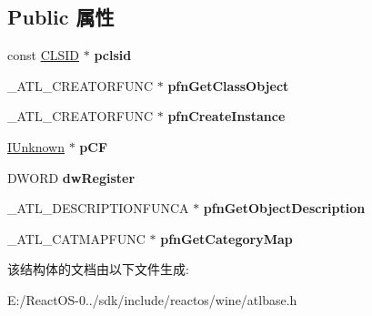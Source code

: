 \subsection*{Public 属性}
\begin{DoxyCompactItemize}
\item 
\mbox{\label{struct___a_t_l___o_b_j_m_a_p___e_n_t_r_y_a___t_a_g_a61c8400c254e4141c89e9dbbc0a05149}} 
const \hyperlink{struct___i_i_d}{C\+L\+S\+ID} $\ast$ {\bfseries pclsid}
\item 
\mbox{\label{struct___a_t_l___o_b_j_m_a_p___e_n_t_r_y_a___t_a_g_a5ac50fe60fd2d99e35f18f5c767abbc6}} 
\+\_\+\+A\+T\+L\+\_\+\+C\+R\+E\+A\+T\+O\+R\+F\+U\+NC $\ast$ {\bfseries pfn\+Get\+Class\+Object}
\item 
\mbox{\label{struct___a_t_l___o_b_j_m_a_p___e_n_t_r_y_a___t_a_g_a2960aeb07da8d9ebedf86a6446924480}} 
\+\_\+\+A\+T\+L\+\_\+\+C\+R\+E\+A\+T\+O\+R\+F\+U\+NC $\ast$ {\bfseries pfn\+Create\+Instance}
\item 
\mbox{\label{struct___a_t_l___o_b_j_m_a_p___e_n_t_r_y_a___t_a_g_a003a8c563b91eae03b6395763f1d0c79}} 
\hyperlink{interface_i_unknown}{I\+Unknown} $\ast$ {\bfseries p\+CF}
\item 
\mbox{\label{struct___a_t_l___o_b_j_m_a_p___e_n_t_r_y_a___t_a_g_a1ef7acdd92767431937c5587e6e17b47}} 
D\+W\+O\+RD {\bfseries dw\+Register}
\item 
\mbox{\label{struct___a_t_l___o_b_j_m_a_p___e_n_t_r_y_a___t_a_g_a185e803a04bbd395534852f1b8445780}} 
\+\_\+\+A\+T\+L\+\_\+\+D\+E\+S\+C\+R\+I\+P\+T\+I\+O\+N\+F\+U\+N\+CA $\ast$ {\bfseries pfn\+Get\+Object\+Description}
\item 
\mbox{\label{struct___a_t_l___o_b_j_m_a_p___e_n_t_r_y_a___t_a_g_a3cd6e0e0a8ba6f4b8ad0449b9b1dfd0a}} 
\+\_\+\+A\+T\+L\+\_\+\+C\+A\+T\+M\+A\+P\+F\+U\+NC $\ast$ {\bfseries pfn\+Get\+Category\+Map}
\end{DoxyCompactItemize}


该结构体的文档由以下文件生成\+:\begin{DoxyCompactItemize}
\item 
E\+:/\+React\+O\+S-\/0../sdk/include/reactos/wine/atlbase.\+h\end{DoxyCompactItemize}
